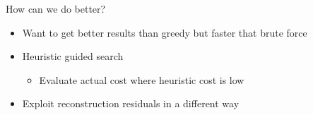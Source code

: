 \documentclass[english,aspectratio=43]{beamer}
\begin{document}
\begin{frame}{How can we do better?}
	\begin{itemize}
	    \setlength\itemsep{2em}
	    
	    \item Want to get better results than greedy but faster that brute force
		    
		\item Heuristic guided search
	    \begin{itemize}
    		\item Evaluate actual cost where heuristic cost is low
    	\end{itemize}
    	
    	\item Exploit reconstruction residuals in a different way

	\end{itemize}
	
\end{frame}



\end{document}
